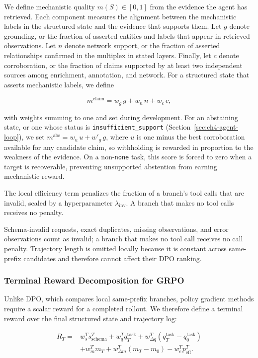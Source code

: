 We define mechanistic quality $m(S) \in [0,1]$ from the evidence the agent has retrieved. Each component measures the alignment between the mechanistic labels in the structured state and the evidence that supports them. Let $g$ denote grounding, or the fraction of asserted entities and labels that appear in retrieved observations. Let $n$ denote network support, or the fraction of asserted relationships confirmed in the multiplex in stated layers. Finally, let $c$ denote corroboration, or the fraction of claims supported by at least two independent sources among enrichment, annotation, and network. For a structured state that asserts mechanistic labels, we define

\begin{equation*}
    m^{\mathrm{claim}} = w_g\,g + w_n\,n + w_c\,c,
\end{equation*}

with weights summing to one and set during development. For an abstaining state, or one whose status is \texttt{insufficient\_support} (Section~\ref{sec:ch4-agent-loop}), we set $m^{\mathrm{abs}} = w_u\,u + w'_g\,g$, where $u$ is one minus the best corroboration available for any candidate claim, so withholding is rewarded in proportion to the weakness of the evidence. On a non-\texttt{none} task, this score is forced to zero when a target is recoverable, preventing unsupported abstention from earning mechanistic reward.

The local efficiency term penalizes the fraction of a branch's tool calls that are invalid, scaled by a hyperparameter $\lambda_{\mathrm{inv}}$. A branch that makes no tool calls receives no penalty.

Schema-invalid requests, exact duplicates, missing observations, and error observations count as invalid; a branch that makes no tool call receives no call penalty. Trajectory length is omitted locally because it is constant across same-prefix candidates and therefore cannot affect their DPO ranking.

\subsubsection{Terminal Reward Decomposition for GRPO}\label{sec:ch4-terminal-reward}
Unlike DPO, which compares local same-prefix branches, policy gradient methods require a scalar reward for a completed rollout. We therefore define a terminal reward over the final structured state and trajectory log:

\begin{equation*}
\begin{aligned}
    R_T={}&w_s^T s_{\mathrm{schema}}^T
    +w_q^T q_T^{\mathrm{task}}
    +w_{\Delta q}^T\left(q_T^{\mathrm{task}}-q_0^{\mathrm{task}}\right) \\
    &+w_m^T m_T
    +w_{\Delta m}^T(m_T-m_0)
    -w_e^T p_{\mathrm{eff}}^T.
\end{aligned}
\end{equation*}

